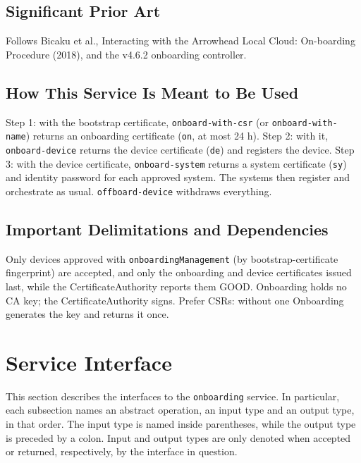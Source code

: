 \documentclass[a4paper]{arrowhead}
\begin{document}
\subsection{Significant Prior Art}

Follows Bicaku et al., Interacting with the Arrowhead Local Cloud: On-boarding Procedure (2018), and the v4.6.2 onboarding controller.

\subsection{How This Service Is Meant to Be Used}

Step 1: with the bootstrap certificate, \texttt{onboard-\allowbreak{}with-\allowbreak{}csr} (or \texttt{onboard-\allowbreak{}with-\allowbreak{}name}) returns an onboarding certificate (\texttt{on}, at most 24 h). Step 2: with it, \texttt{onboard-\allowbreak{}device} returns the device certificate (\texttt{de}) and registers the device. Step 3: with the device certificate, \texttt{onboard-\allowbreak{}system} returns a system certificate (\texttt{sy}) and identity password for each approved system. The systems then register and orchestrate as usual. \texttt{offboard-\allowbreak{}device} withdraws everything.

\subsection{Important Delimitations and Dependencies}
\label{sec:delimitations}

Only devices approved with \texttt{onboarding\allowbreak{}Management} (by bootstrap-certificate fingerprint) are accepted, and only the onboarding and device certificates issued last, while the Certificate\allowbreak{}Authority reports them GOOD. Onboarding holds no CA key; the Certificate\allowbreak{}Authority signs. Prefer CSRs: without one Onboarding generates the key and returns it once.

\newpage

\section{Service Interface}
\label{sec:operations}

This section describes the interfaces to the \texttt{onboarding} service.
In particular, each subsection names an abstract operation, an input type and an output type, in that order.
The input type is named inside parentheses, while the output type is preceded by a colon.
Input and output types are only denoted when accepted or returned, respectively, by the interface in question.
\end{document}
